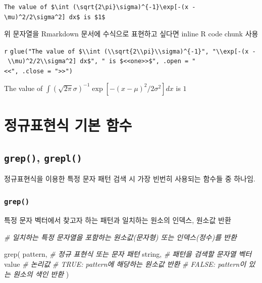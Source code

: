 \documentclass[
  11pt,
]{krantz}
\newenvironment{Shaded}{\begin{snugshade}}{\end{snugshade}}
\newcommand{\CommentTok}[1]{\textcolor[rgb]{0.37,0.37,0.37}{\textit{#1}}}
\newcommand{\FunctionTok}[1]{\textcolor[rgb]{0,0,0}{#1}}
\newcommand{\NormalTok}[1]{#1}
\begin{document}
\begin{verbatim}
The value of $\int (\sqrt{2\pi}\sigma)^{-1}\exp[-(x - \mu)^2/2\sigma^2] dx$ is $1$
\end{verbatim}

\normalsize

위 문자열을 Rmarkdown 문서에 수식으로 표현하고 싶다면 inline R code chunk 사용

\texttt{\textasciigrave{}r} \texttt{glue("The\ value\ of\ \$\textbackslash{}\textbackslash{}int\ (\textbackslash{}\textbackslash{}sqrt\{2\textbackslash{}\textbackslash{}pi\}\textbackslash{}\textbackslash{}sigma)\^{}\{-1\}",\ "\textbackslash{}\textbackslash{}exp{[}-(x\ -\ \textbackslash{}\textbackslash{}mu)\^{}2/2\textbackslash{}\textbackslash{}sigma\^{}2{]}\ dx\$",\ "\ is\ \$\textless{}\textless{}one\textgreater{}\textgreater{}\$",\ .open\ =\ "\textless{}\textless{}",\ .close\ =\ "\textgreater{}\textgreater{}")} \texttt{\textasciigrave{}}

The value of \(\int (\sqrt{2\pi}\sigma)^{-1}\exp[-(x - \mu)^2/2\sigma^2] dx\) is \(1\)

\hypertarget{regexp-basic-fun}{%
\section{정규표현식 기본 함수}\label{regexp-basic-fun}}

\hypertarget{grep-grepl}{%
\subsection{\texorpdfstring{\textbf{\texttt{grep()}, \texttt{grepl()}}}{grep(), grepl()}}\label{grep-grepl}}

정규표현식을 이용한 특정 문자 패턴 검색 시 가장 빈번히 사용되는 함수들 중 하나임.

\hypertarget{grep}{%
\subsubsection*{\texorpdfstring{\textbf{\texttt{grep()}}}{grep()}}\label{grep}}


특정 문자 벡터에서 찾고자 하는 패턴과 일치하는 원소의 인덱스, 원소값 반환

\footnotesize

\begin{Shaded}
\begin{Highlighting}[]
\CommentTok{\# 일치하는 특정 문자열을 포함하는 원소값(문자형) 또는 인덱스(정수)를 반환}

\FunctionTok{grep}\NormalTok{(}
\NormalTok{  pattern, }\CommentTok{\# 정규 표현식 또는 문자 패턴}
\NormalTok{  string,  }\CommentTok{\# 패턴을 검색할 문자열 벡터}
\NormalTok{  value    }\CommentTok{\# 논리값 }
           \CommentTok{\# TRUE: pattern에 해당하는 원소값 반환}
           \CommentTok{\# FALSE: pattern이 있는 원소의 색인 반환}
\NormalTok{)}
\end{Highlighting}
\end{Shaded}
\end{document}
